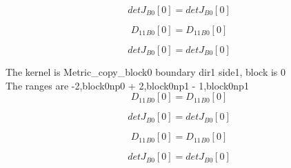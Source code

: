 \documentclass{article}
\begin{document}
\begin{dmath}{detJ{_{B0}}}[{0}] = {detJ{_{B0}}}[{0}]\end{dmath}

\begin{dmath}{D_{11}{_{B0}}}[{0}] = {D_{11}{_{B0}}}[{0}]\end{dmath}

\begin{dmath}{detJ{_{B0}}}[{0}] = {detJ{_{B0}}}[{0}]\end{dmath}

\noindent The kernel is Metric_copy_block0 boundary dir1 side1, block is 0\\\noindent The ranges are -2,block0np0 + 2,block0np1 - 1,block0np1\\\begin{dmath}{D_{11}{_{B0}}}[{0}] = {D_{11}{_{B0}}}[{0}]\end{dmath}

\begin{dmath}{detJ{_{B0}}}[{0}] = {detJ{_{B0}}}[{0}]\end{dmath}

\begin{dmath}{D_{11}{_{B0}}}[{0}] = {D_{11}{_{B0}}}[{0}]\end{dmath}

\begin{dmath}{detJ{_{B0}}}[{0}] = {detJ{_{B0}}}[{0}]\end{dmath}
\end{document}
